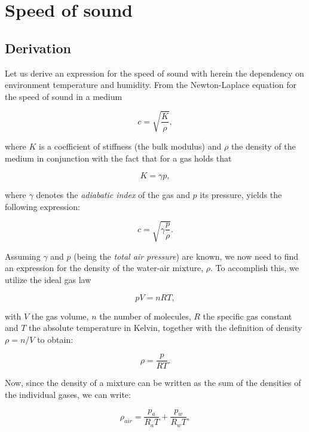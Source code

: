 \documentclass[11pt,titlepage]{report}
\begin{document}
\chapter{Speed of sound}
\section{Derivation}
Let us derive an expression for the speed of sound with herein the dependency on environment temperature and humidity. From the Newton-Laplace equation for the speed of sound in a medium

\begin{equation}
	c = \sqrt{\frac{K}{\rho}},
\end{equation}

where $K$ is a coefficient of stiffness (the bulk modulus) and $\rho$ the density of the medium in conjunction with the fact that for a gas holds that

\begin{equation}
	K = \gamma p,
\end{equation}

where $\gamma$ denotes the \emph{adiabatic index} of the gas and $p$ its pressure, yields the following expression:

\begin{equation} \label{eq:c1}
	c = \sqrt{\gamma \frac{p}{\rho}}.
\end{equation}

Assuming $\gamma$ and $p$ (being the \emph{total air pressure}) are known, we now need to find an expression for the density of the water-air mixture, $\rho$.
To accomplish this, we utilize the ideal gas law

\begin{equation}
	p V = n R T,
\end{equation}

with $V$ the gas volume, $n$ the number of molecules, $R$ the specific gas constant and $T$ the absolute temperature in Kelvin, together with the definition of density $\rho = n / V$ to obtain:

\begin{equation}
	\rho = \frac{p}{R T}.
\end{equation}

Now, since the density of a mixture can be written as the sum of the densities of the individual gases, we can write:

\begin{equation} \label{eq:rho1}
	\rho_{air} = \frac{p_a}{R_a T} + \frac{p_w}{R_w T},
\end{equation}
\end{document}
